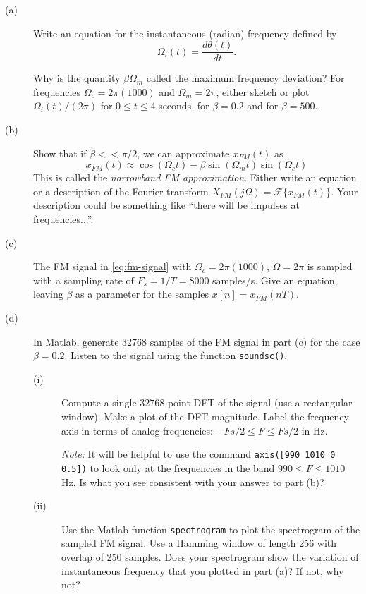 \documentclass[12pt]{report}
\begin{document}
\begin{description}
	\item[(a)] Write an equation for the instantaneous (radian) frequency defined by
	\begin{equation}
		\Omega_i(t) = \dfrac{d\theta(t)}{dt}.
	\end{equation}
	
	Why is the quantity $\beta\Omega_m$ called the maximum frequency deviation? For frequencies $\Omega_c = 2\pi(1000)$ and $\Omega_m = 2\pi$, either sketch or plot $\Omega_i(t)/(2\pi)$ for $0 \leq t \leq 4$ seconds, for $\beta = 0.2$ and for $\beta = 500$.
	
	\item[(b)] Show that if $\beta << \pi/2$, we can approximate $x_{FM}(t)$ as
	\begin{equation}
		x_{FM}(t) \approx \cos(\Omega_ct) - \beta\sin(\Omega_mt)\sin(\Omega_ct)
	\end{equation}
	This is called the \textit{narrowband FM approximation}. Either write an equation or a description of the Fourier transform $X_{FM}(j\Omega) = \mathcal{F}\{x_{FM}(t)\}$. Your description could be something like ``there will be impulses at frequencies...''.
	
	\item[(c)] The FM signal in \eqref{eq:fm-signal} with $\Omega_c = 2\pi(1000)$, $\Omega = 2\pi$ is sampled with a sampling rate of $F_s =1/T =8000$ samples/s. Give an equation, leaving $\beta$ as a parameter for the samples $x[n] = x_{FM}(nT)$.
	
	\item[(d)] In Matlab, generate 32768 samples of the FM signal in part (c) for the case $\beta = 0.2$. Listen to the signal using the function \texttt{soundsc()}.
	\begin{description}
		\item[(i)] Compute a single 32768-point DFT of the signal (use a rectangular window). Make a plot of the DFT magnitude. Label the frequency axis in terms of analog frequencies: $-Fs/2 \leq F \leq Fs/2$ in Hz. 
		
		\textit{Note:} It will be helpful to use the command \texttt{axis([990 1010 0 0.5])} to look only at the frequencies in the band
		$990 \leq F \leq 1010$ Hz. Is what you see consistent with your answer to part (b)? 
		
		\item[(ii)] Use the Matlab function \texttt{spectrogram} to plot the spectrogram of the sampled FM signal. Use a Hamming window of length 256 with overlap of 250 samples. Does your spectrogram show the variation of instantaneous frequency that you plotted in part (a)? If not, why not?
	\end{description}


\end{description}
\end{document}
